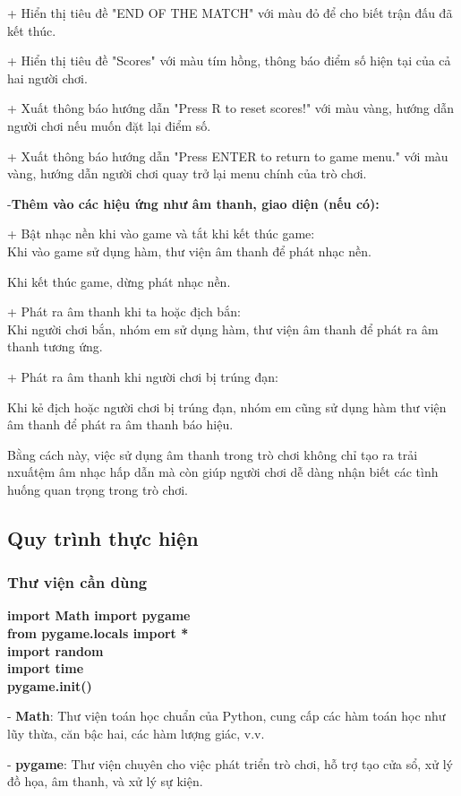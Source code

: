 \documentclass[a4paper]{article}
\begin{document}
+ Hiển thị tiêu đề "END OF THE MATCH" với màu đỏ để cho biết trận đấu đã
kết thúc.

+ Hiển thị tiêu đề "Scores" với màu tím hồng, thông báo điểm số hiện tại
của cả hai người chơi.

+ Xuất thông báo hướng dẫn "Press R to reset scores!" với màu vàng,
hướng dẫn người chơi nếu muốn đặt lại điểm số.

+ Xuất thông báo hướng dẫn "Press ENTER to return to game menu." với màu
vàng, hướng dẫn người chơi quay trở lại menu chính của trò chơi.

-\textbf{Thêm vào các hiệu ứng như âm thanh, giao diện (nếu có):}

+ Bật nhạc nền khi vào game và tắt khi kết thúc game:\\
Khi vào game sử dụng hàm, thư viện âm thanh để phát nhạc nền.

Khi kết thúc game, dừng phát nhạc nền.

+ Phát ra âm thanh khi ta hoặc địch bắn:\\
Khi người chơi bắn, nhóm em sử dụng hàm, thư viện âm thanh để phát ra âm
thanh tương ứng.

+ Phát ra âm thanh khi người chơi bị trúng đạn:

Khi kẻ địch hoặc người chơi bị trúng đạn, nhóm em cũng sử dụng hàm thư
viện âm thanh để phát ra âm thanh báo hiệu.

Bằng cách này, việc sử dụng âm thanh trong trò chơi không chỉ tạo ra
trải nxuấtệm âm nhạc hấp dẫn mà còn giúp người chơi dễ dàng nhận biết
các tình huống quan trọng trong trò chơi.
\newpage
\subsection{Quy trình thực hiện}
\subsubsection{Thư viện cần dùng}
\textbf{import Math import pygame}\\
\textbf{from pygame.locals import *}\\
\textbf{import random}\\
\textbf{import time}\\
\textbf{pygame.init()}

- \textbf{Math}: Thư viện toán học chuẩn của Python, cung cấp các hàm
toán học như lũy thừa, căn bậc hai, các hàm lượng giác, v.v.

- \textbf{pygame}: Thư viện chuyên cho việc phát triển trò chơi, hỗ trợ
tạo cửa sổ, xử lý đồ họa, âm thanh, và xử lý sự kiện.
\end{document}
